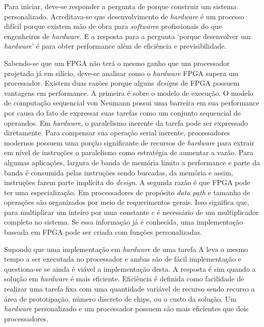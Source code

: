 Para iniciar, deve-se responder a pergunta de porque construir um sistema personalizado. Acreditava-se que desenvolvimento de \textit{hardware} é um processo difícil porque existem mão de obra para \textit{software}s profissionais do que engenheiros de \textit{hardware}. E a resposta para a pergunta ‘porque desenvolver um \textit{hardware}’ é para obter performance além de eficiência e previsibilidade.

Sabendo-se que um FPGA não terá o mesmo ganho que um processador projetado já em silício, deve-se analisar como o \textit{hardware} FPGA supera um processador. Existem duas razões porque alguns \textit{design}s de FPGA possuem vantagens em performance. A primeira é sobre o modelo de execução. O modelo de computação sequencial von Neumann possui uma barreira em sua performance por causa do fato de expressar suas tarefas como um conjunto sequencial de operandos. Em \textit{hardware}, o paralelismo inerente da tarefa pode ser expressado diretamente. Para compensar sua operação serial inerente, processadores modernos possuem uma porção significante de recursos de \textit{hardware} para extrair em nível de instruções o paralelismo como estratégia de aumentar a vazão. Para algumas aplicações, largura de banda de memória limita a performance e parte da banda é consumida pelas instruções sendo buscadas, da memória e assim, instruções fazem parte implícita do \textit{design}. A segunda razão é que FPGA pode ter uma especialização. Em processadores de propósito \textit{data path} e tamanho de operações são organizados por meio de requerimentos gerais. Isso significa que, para multiplicar um inteiro por uma constante $ c $ é necessário de um multiplicador completo no sistema. Se essa informação já é conhecida, uma implementação baseada em FPGA pode ser criada com funções personalizadas.

Supondo que uma implementação em \textit{hardware} de uma tarefa A leva o mesmo tempo a ser executada no processador e ambas são de fácil implementação e questiona-se se ainda é viável a implementação desta. A resposta é sim quando a solução em \textit{hardware} é mais eficiente. Eficiência é definida como facilidade de realizar uma tarefa fixa com uma quantidade variável de recurso sendo recurso a área de prototipação, número discreto de chips, ou o custo da solução. Um \textit{hardware} personalizado e um processador possuem são mais eficientes que dois processadores.

